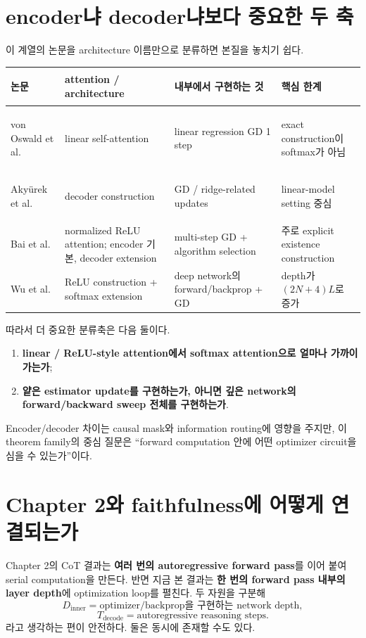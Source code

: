 \documentclass[11pt,a4paper,oneside,openany]{memoir}
\theoremstyle{definition}
\begin{document}
\section{encoder냐 decoder냐보다 중요한 두 축}

이 계열의 논문을 architecture 이름만으로 분류하면 본질을 놓치기 쉽다.

\begin{center}
\small
\begin{tabularx}{\textwidth}{>{\bfseries\raggedright\arraybackslash}p{}YYY}
\toprule
논문 & attention / architecture & 내부에서 구현하는 것 & 핵심 한계 \\
\midrule
von Oswald et al. & linear self-attention & linear regression GD 1 step & exact construction이 softmax가 아님 \\
Aky\"urek et al. & decoder construction & GD / ridge-related updates & linear-model setting 중심 \\
Bai et al. & normalized ReLU attention; encoder 기본, decoder extension & multi-step GD + algorithm selection & 주로 explicit existence construction \\
Wu et al. & ReLU construction + softmax extension & deep network의 forward/backprop + GD & depth가 $(2N+4)L$로 증가 \\
\bottomrule
\end{tabularx}
\end{center}

따라서 더 중요한 분류축은 다음 둘이다.

\begin{enumerate}
\item \textbf{linear / ReLU-style attention에서 softmax attention으로 얼마나 가까이 가는가};
\item \textbf{얕은 estimator update를 구현하는가, 아니면 깊은 network의 forward/backward sweep 전체를 구현하는가}.
\end{enumerate}

Encoder/decoder 차이는 causal mask와 information routing에 영향을 주지만, 이 theorem family의 중심 질문은 ``forward computation 안에 어떤 optimizer circuit을 심을 수 있는가''이다.

\section{Chapter 2와 faithfulness에 어떻게 연결되는가}

Chapter 2의 CoT 결과는 \textbf{여러 번의 autoregressive forward pass}를 이어 붙여 serial computation을 만든다.
반면 지금 본 결과는 \textbf{한 번의 forward pass 내부의 layer depth}에 optimization loop를 펼친다. 두 자원을 구분해
\[
D_{\mathrm{inner}}
=\text{optimizer/backprop을 구현하는 network depth},
\]
\[
T_{\mathrm{decode}}
=\text{autoregressive reasoning steps}.
\]
라고 생각하는 편이 안전하다. 둘은 동시에 존재할 수도 있다.
\end{document}
